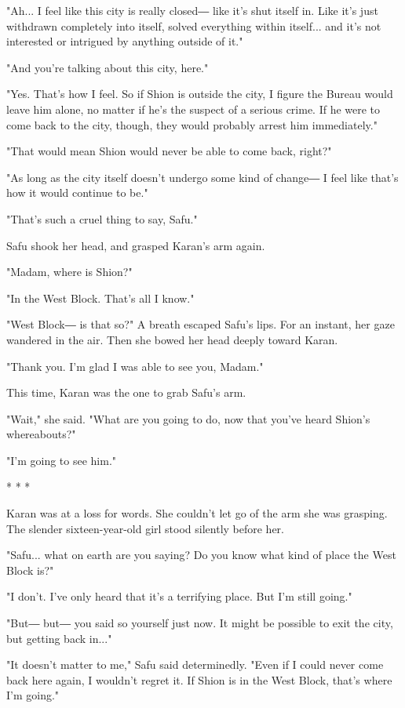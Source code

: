 "Ah... I feel like this city is really closed― like it's shut itself in.
Like it's just withdrawn completely into itself, solved everything
within itself... and it's not interested or intrigued by anything
outside of it."

"And you're talking about this city, here."

"Yes. That's how I feel. So if Shion is outside the city, I figure the
Bureau would leave him alone, no matter if he's the suspect of a serious
crime. If he were to come back to the city, though, they would probably
arrest him immediately."

"That would mean Shion would never be able to come back, right?"

"As long as the city itself doesn't undergo some kind of change― I feel
like that's how it would continue to be."

"That's such a cruel thing to say, Safu."

Safu shook her head, and grasped Karan's arm again.

"Madam, where is Shion?"

"In the West Block. That's all I know."

"West Block― is that so?" A breath escaped Safu's lips. For an instant,
her gaze wandered in the air. Then she bowed her head deeply toward
Karan.

"Thank you. I'm glad I was able to see you, Madam."

This time, Karan was the one to grab Safu's arm.

"Wait," she said. "What are you going to do, now that you've heard
Shion's whereabouts?"

"I'm going to see him."

* * *

Karan was at a loss for words. She couldn't let go of the arm she was
grasping. The slender sixteen-year-old girl stood silently before her.

"Safu... what on earth are you saying? Do you know what kind of place
the West Block is?"

"I don't. I've only heard that it's a terrifying place. But I'm still
going."

"But― but― you said so yourself just now. It might be possible to exit
the city, but getting back in..."

"It doesn't matter to me," Safu said determinedly. "Even if I could
never come back here again, I wouldn't regret it. If Shion is in the
West Block, that's where I'm going."

